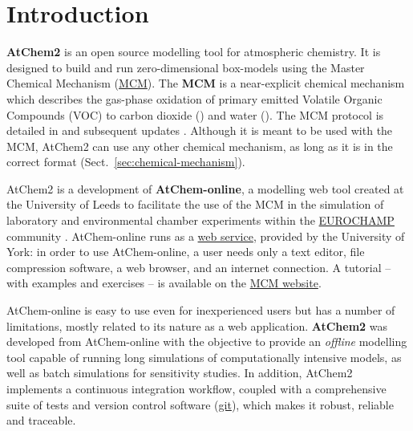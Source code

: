 %
%
%
%

\chapter{Introduction} \label{ch:introduction}

\textbf{AtChem2} is an open source modelling tool for atmospheric
chemistry. It is designed to build and run zero-dimensional
box-models using the Master Chemical Mechanism
(\href{https://mcm.york.ac.uk/MCM}{MCM}). The \textbf{MCM} is a
near-explicit chemical mechanism which describes the gas-phase
oxidation of primary emitted Volatile Organic Compounds (VOC) to
carbon dioxide () and water (). The MCM protocol is
detailed in \citet{jenkin_1997} and subsequent updates
\citep{saunders_2003, jenkin_2003, bloss_2005, jenkin_2012, jenkin_2015}.
Although it is meant to be used with the MCM, AtChem2 can use any
other chemical mechanism, as long as it is in the correct format
(Sect.~\ref{sec:chemical-mechanism}).

AtChem2 is a development of \textbf{AtChem-online}, a modelling web
tool created at the University of Leeds to facilitate the use of the
MCM in the simulation of laboratory and environmental chamber
experiments within the \href{https://www.eurochamp.org}{EUROCHAMP}
community \citep{martin_2009}. AtChem-online runs as a
\href{https://atchem.york.ac.uk}{web service}, provided by the
University of York: in order to use AtChem-online, a user needs only a
text editor, file compression software, a web browser, and an internet
connection. A tutorial -- with examples and exercises -- is available on
the \href{https://mcm.york.ac.uk/MCM/atchemonline/intro}{MCM website}.

AtChem-online is easy to use even for inexperienced users but has a
number of limitations, mostly related to its nature as a web
application. \textbf{AtChem2} was developed from AtChem-online with the
objective to provide an \emph{offline} modelling tool capable of
running long simulations of computationally intensive models, as well
as batch simulations for sensitivity studies. In addition, AtChem2
implements a continuous integration workflow, coupled with a
comprehensive suite of tests and version control software
(\href{https://git-scm.com}{git}), which makes it robust, reliable
and traceable.

